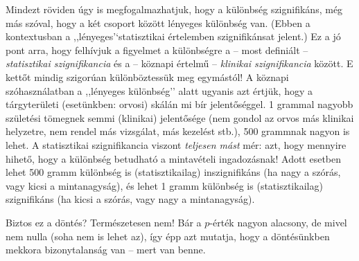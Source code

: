 \documentclass[]{book}
\begin{document}
Mindezt röviden úgy is megfogalmazhatjuk, hogy a különbség szignifikáns,
még más szóval, hogy a két csoport között lényeges különbség van. (Ebben
a kontextusban a ,,lényeges'`statisztikai értelemben szignifikánsat
jelent.) Ez a jó pont arra, hogy felhívjuk a figyelmet a különbségre a
-- most definiált -- \emph{statisztikai szignifikancia} és a -- köznapi
értelmű -- \emph{klinikai szignifikancia} között. E kettőt mindig
szigorúan különböztessük meg egymástól! A köznapi szóhasználatban a
,,lényeges különbség'' alatt ugyanis azt értjük, hogy a tárgyterületi
(esetünkben: orvosi) skálán mi bír jelentőséggel. 1 grammal nagyobb
születési tömegnek semmi (klinikai) jelentősége (nem gondol az orvos más
klinikai helyzetre, nem rendel más vizsgálat, más kezelést stb.), 500
grammnak nagyon is lehet. A statisztikai szignifikancia viszont
\emph{teljesen mást} mér: azt, hogy mennyire hihető, hogy a különbség
betudható a mintavételi ingadozásnak! Adott esetben lehet 500 gramm
különbség is (statisztikailag) inszignifikáns (ha nagy a szórás, vagy
kicsi a mintanagyság), és lehet 1 gramm különbség is (statisztikailag)
szignifikáns (ha kicsi a szórás, vagy nagy a mintanagyság).

Biztos ez a döntés? Természetesen nem! Bár a \(p\)-érték nagyon
alacsony, de mivel nem nulla (soha nem is lehet az), így épp azt
mutatja, hogy a döntésünkben mekkora bizonytalanság van -- mert van
benne.
\end{document}
